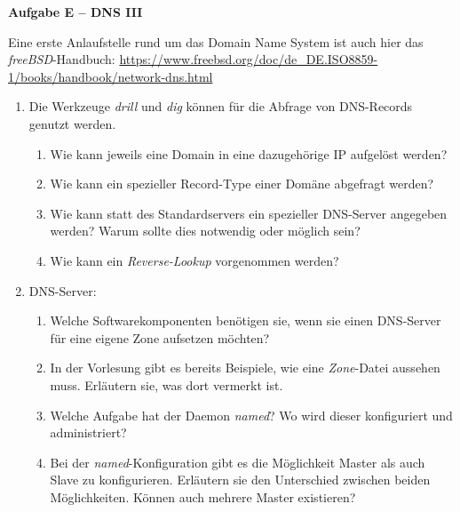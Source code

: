 \documentclass[paper=a4,fontsize=11pt]{scrartcl}%
\numberwithin{equation}{section}
\begin{document}
\begin{center}
\Large{\textbf{Aufgabe E -- DNS III}}
\end{center}
Eine erste Anlaufstelle rund um das Domain Name System ist auch hier das \emph{freeBSD}-Handbuch: \url{https://www.freebsd.org/doc/de_DE.ISO8859-1/books/handbook/network-dns.html}
\begin{enumerate}
	\item Die Werkzeuge \emph{drill} und \emph{dig} können für die Abfrage von DNS-Records genutzt werden.
	\begin{enumerate}
		\item Wie kann jeweils eine Domain in eine dazugehörige IP aufgelöst werden?
		\item Wie kann ein spezieller Record-Type einer Domäne abgefragt werden?
		\item Wie kann statt des Standardservers ein spezieller DNS-Server angegeben werden? Warum sollte dies notwendig oder möglich sein?
		\item Wie kann ein \emph{Reverse-Lookup} vorgenommen werden?
	\end{enumerate}
	\item DNS-Server:
	\begin{enumerate}
		\item Welche Softwarekomponenten benötigen sie, wenn sie einen DNS-Server für eine eigene Zone aufsetzen möchten?
		\item In der Vorlesung gibt es bereits Beispiele, wie eine \emph{Zone}-Datei aussehen muss. Erläutern sie, was dort vermerkt ist.
		\item Welche Aufgabe hat der Daemon \emph{named}? Wo wird dieser konfiguriert und administriert?
		\item Bei der \emph{named}-Konfiguration gibt es die Möglichkeit Master als auch Slave zu konfigurieren. Erläutern sie den Unterschied zwischen beiden Möglichkeiten. Können auch mehrere Master existieren? 
	\end{enumerate}
\end{enumerate}

\printbibliography
\end{document}
